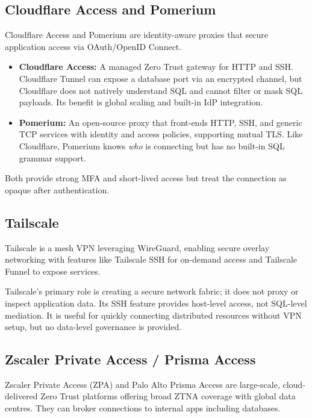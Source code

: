 \subsection{Cloudflare Access and Pomerium}

Cloudflare Access and Pomerium are identity-aware proxies that secure application access via OAuth/OpenID Connect.

\begin{itemize}
  \item \textbf{Cloudflare Access:} A managed Zero Trust gateway for HTTP and SSH. Cloudflare Tunnel can expose a database port via an encrypted channel, but Cloudflare does not natively understand SQL and cannot filter or mask SQL payloads. Its benefit is global scaling and built-in IdP integration.
  \item \textbf{Pomerium:} An open-source proxy that front-ends HTTP, SSH, and generic TCP services with identity and access policies, supporting mutual TLS. Like Cloudflare, Pomerium knows \emph{who} is connecting but has no built-in SQL grammar support.
\end{itemize}

Both provide strong MFA and short-lived access but treat the connection as opaque after authentication.

\subsection{Tailscale}

Tailscale is a mesh VPN leveraging WireGuard, enabling secure overlay networking with features like Tailscale SSH for on-demand access and Tailscale Funnel to expose services.

Tailscale's primary role is creating a secure network fabric; it does not proxy or inspect application data. Its SSH feature provides host-level access, not SQL-level mediation. It is useful for quickly connecting distributed resources without VPN setup, but no data-level governance is provided.

\subsection{Zscaler Private Access / Prisma Access}

Zscaler Private Access (ZPA) and Palo Alto Prisma Access are large-scale, cloud-delivered Zero Trust platforms offering broad ZTNA coverage with global data centres. They can broker connections to internal apps including databases.

